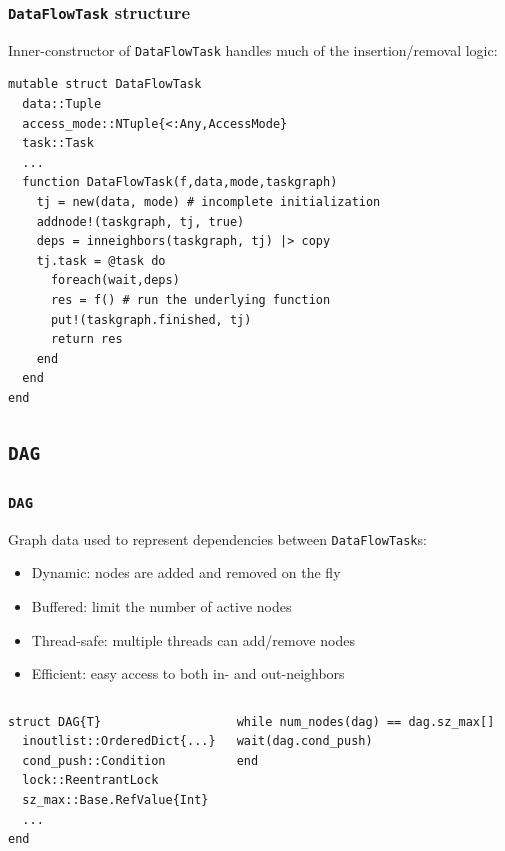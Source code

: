 \documentclass{beamer}
\begin{document}
\begin{frame}[fragile]

\frametitle{\texttt{DataFlowTask} structure}

\small{\alert{Inner-constructor of \texttt{DataFlowTask} handles much of
the insertion/removal logic:}}

\hrulefill
\begin{verbatim}
mutable struct DataFlowTask
  data::Tuple
  access_mode::NTuple{<:Any,AccessMode}
  task::Task
  ...
  function DataFlowTask(f,data,mode,taskgraph)
    tj = new(data, mode) # incomplete initialization
    addnode!(taskgraph, tj, true) 
    deps = inneighbors(taskgraph, tj) |> copy
    tj.task = @task do
      foreach(wait,deps)
      res = f() # run the underlying function
      put!(taskgraph.finished, tj)
      return res
    end
  end
end
\end{verbatim}

\end{frame} 

\subsection{\texttt{DAG}}

\begin{frame}[fragile]
\frametitle{{\texttt{DAG}}}  

Graph data used to represent dependencies between \texttt{DataFlowTask}s:

\begin{itemize}
  \item Dynamic: nodes are added and removed on the fly
  \item Buffered: limit the number of active nodes
  \item Thread-safe: multiple threads can add/remove nodes
  \item Efficient: easy access to both in- and out-neighbors
\end{itemize}

\hrulefill

\begin{columns}[T]

\begin{exampleblock}{}
\begin{verbatim}
struct DAG{T}
  inoutlist::OrderedDict{...}
  cond_push::Condition
  lock::ReentrantLock
  sz_max::Base.RefValue{Int}
  ...
end
\end{verbatim}
\end{exampleblock}


\begin{exampleblock}{}
\begin{verbatim}
while num_nodes(dag) == dag.sz_max[]
wait(dag.cond_push)
end
\end{verbatim}
\end{exampleblock}

\end{columns}

\end{frame}
\end{document}

